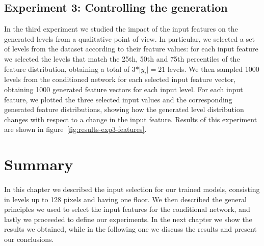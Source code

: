 \subsection{Experiment 3: Controlling the generation}
In the third experiment we studied the impact of the input features on the generated levels from a qualitative point of view. In particular, we selected a set of levels from the dataset according to their feature values: for each input feature we selected the levels that match the 25th, 50th and 75th percentiles of the feature distribution, obtaining a total of $3 * \vert y_{i} \vert = 21$ levels. We then sampled 1000 levels from the conditioned network for each selected input feature vector, obtaining 1000 generated feature vectors for each input level. For each input feature, we plotted the three selected input values and the corresponding generated feature distributions, showing how the generated level distribution changes with respect to a change in the input feature. Results of this experiment are shown in figure~\ref{fig:results-exp3-features}.

\section{Summary}
\paragraph{} In this chapter we described the input selection for our trained models, consisting in levels up to 128 pixels and having one floor. We then described the general principles we used to select the input features for the conditional network, and lastly we proceeded to define our experiments. In the next chapter we show the results we obtained, while in the following one we discuss the results and present our conclusions.